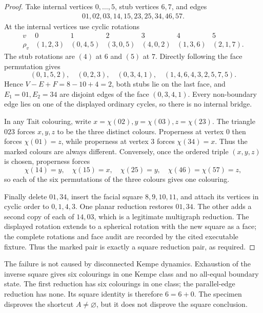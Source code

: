 \begin{proof}
Take internal vertices \(0,\ldots,5\), stub vertices \(6,7\), and edges
\[
\begin{split}
01,02,03,14,15,23,25,34,46,57.
\end{split}
\]
At the internal vertices use cyclic rotations
\[
\begin{array}{c|rrrrrr}
v&0&1&2&3&4&5\\ \hline
\rho_v&(1,2,3)&(0,4,5)&(3,0,5)&(4,0,2)&(1,3,6)&(2,1,7).
\end{array}
\]
The stub rotations are \((4)\) at \(6\) and \((5)\) at \(7\).  Directly
following the face permutation gives
\[
 (0,1,5,2),\quad (0,2,3),\quad (0,3,4,1),\quad
 (1,4,6,4,3,2,5,7,5).
\]
Hence \(V-E+F=8-10+4=2\), both stubs lie on the last face, and
\(E_1=01,E_2=34\) are disjoint edges of the face \((0,3,4,1)\).
Every non-boundary edge lies on one of the displayed ordinary cycles, so
there is no internal bridge.

In any Tait colouring, write
\(x=\chi(02),y=\chi(03),z=\chi(23)\).  The triangle \(023\) forces
\(x,y,z\) to be the three distinct colours.  Properness at vertex \(0\)
then forces \(\chi(01)=z\), while properness at vertex \(3\) forces
\(\chi(34)=x\).  Thus the marked colours are always different.
Conversely, once the ordered triple \((x,y,z)\) is chosen, properness forces
\[
 \chi(14)=y,\quad \chi(15)=x,\quad \chi(25)=y,
 \quad\chi(46)=\chi(57)=z,
\]
so each of the six permutations of the three colours gives one colouring.

Finally delete \(01,34\), insert the facial square
\(8,9,10,11\), and attach its vertices in cyclic order to
\(0,1,4,3\).  One planar reduction restores \(01,34\).  The other adds a
second copy of each of \(14,03\), which is a legitimate multigraph
reduction.  The displayed rotation extends to a spherical rotation with the
new square as a face; the complete rotations and face audit are recorded by
the cited executable fixture.  Thus the marked pair is exactly a square
reduction pair, as required.
\end{proof}

The failure is not caused by disconnected Kempe dynamics.  Exhaustion of
the inverse square gives six colourings in one Kempe class and no all-equal
boundary state.  The first reduction has six colourings in one class; the
parallel-edge reduction has none.  Its square identity is therefore
\(6=6+0\).  The specimen disproves the shortcut \(A\ne\varnothing\), but it
does not disprove the square conclusion.

